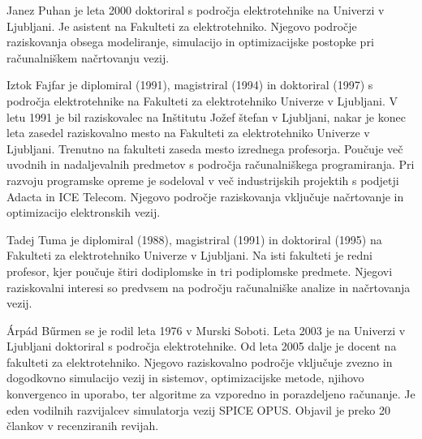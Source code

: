 \documentclass[journal,a4paper,twoside]{sty/IEEEtran}
\begin{document}

\begin{IEEEbiographynophoto}{Janez Puhan} je leta 2000 doktoriral s področja elektrotehnike na Univerzi v Ljubljani. Je asistent na Fakulteti za elektrotehniko. Njegovo področje raziskovanja obsega modeliranje, simulacijo in optimizacijske postopke pri računalniškem načrtovanju vezij.
\end{IEEEbiographynophoto}

\begin{IEEEbiographynophoto}{Iztok Fajfar} je diplomiral (1991), magistriral (1994) in doktoriral (1997) s področja elektrotehnike na Fakulteti za elektrotehniko Univerze v Ljubljani. V letu 1991 je bil raziskovalec na Inštitutu Jožef štefan v Ljubljani, nakar je konec leta zasedel raziskovalno mesto na Fakulteti za elektrotehniko Univerze v Ljubljani. 
Trenutno na fakulteti zaseda mesto izrednega profesorja. Poučuje več uvodnih in nadaljevalnih predmetov s področja računalniškega programiranja. Pri razvoju programske opreme je sodeloval v več industrijskih projektih s podjetji Adacta in ICE Telecom. Njegovo področje raziskovanja vključuje načrtovanje in optimizacijo elektronskih vezij.
\end{IEEEbiographynophoto}

\begin{IEEEbiographynophoto}{Tadej Tuma} je diplomiral (1988), magistriral (1991) in doktoriral (1995) na Fakulteti za elektrotehniko Univerze v Ljubljani. Na isti fakulteti je redni profesor, kjer poučuje štiri dodiplomske in tri podiplomske predmete. Njegovi raziskovalni interesi so predvsem na področju računalniške analize in načrtovanja vezij.
\end{IEEEbiographynophoto}

\begin{IEEEbiographynophoto}{\'{A}rp\'{a}d B\H{u}rmen} se je rodil leta 1976 v Murski Soboti. Leta 2003 je na Univerzi v Ljubljani doktoriral s področja elektrotehnike. Od leta 2005 dalje je docent na fakulteti za elektrotehniko. Njegovo raziskovalno področje vključuje zvezno in dogodkovno simulacijo vezij in sistemov, optimizacijske metode, njihovo konvergenco in uporabo, ter algoritme za vzporedno in porazdeljeno računanje. Je eden vodilnih razvijalcev simulatorja vezij SPICE OPUS. Objavil je preko 20 člankov v recenziranih revijah.
\end{IEEEbiographynophoto}

\vfill

\label{finish}

\end{document}

